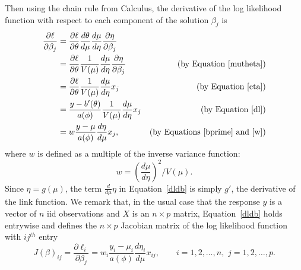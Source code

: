 \documentclass[10pt]{article} %
\begin{document}
Then using the chain rule from Calculus, the derivative of the log likelihood
function with respect to each component of the solution $\beta_j$ is
\begin{align}
\frac{\partial\ell}{\partial\beta_j}
&= \frac{\partial\ell}{\partial\theta}\frac{d\theta}{d\mu}\frac{d\mu}{d\eta}\frac{\partial\eta}{\partial\beta_j} \nonumber\\
&= \frac{\partial\ell}{\partial\theta}\frac{1}{V(\mu)}\frac{d\mu}{d\eta}\frac{\partial\eta}{\partial\beta_j} 
    &\mbox{(by Equation \ref{mutheta})} \nonumber\\
&= \frac{\partial\ell}{\partial\theta}\frac{1}{V(\mu)}\frac{d\mu}{d\eta}x_j
    &\mbox{(by Equation \ref{eta})} \nonumber\\
&= \frac{y- b'(\theta)}{a(\phi)}\frac{1}{V(\mu)}\frac{d\mu}{d\eta}x_j
    &\mbox{(by Equation \ref{dl})} \nonumber\\
&= w\frac{y-\mu}{a(\phi)}\frac{d\eta}{d\mu}x_j,
    &\mbox{(by Equations \ref{bprime} and \ref{w})} \label{dldb}
\end{align}
where $w$ is defined as a multiple of the inverse variance function:
\begin{equation}\label{w}
w = \left(\frac{d\mu}{d\eta}\right)^2 \bigg/ V(\mu).
\end{equation}
Since $\eta=g(\mu)$, the term $\frac{d}{d\mu}\eta$ in Equation~\ref{dldb} is
simply $g'$, the derivative of the link function.  We remark that, in the usual
case that the response $y$ is a vector of $n$ iid observations and $X$ is an
$n\times p$ matrix, Equation~\ref{dldb} holds entrywise and defines the 
$n\times p$ Jacobian matrix of the log likelihood function
with $ij^{th}$ entry
\begin{equation}\label{jacobian}
J(\beta)_{ij} = \frac{\partial\ell_i}{\partial\beta_j}
         = w_i\frac{y_i-\mu_i}{a(\phi)}\frac{d\eta_i}{d\mu}x_{ij},
\qquad i=1, 2, \ldots, n,\,\,j=1,2,\ldots,p.
\end{equation}
\end{document}

